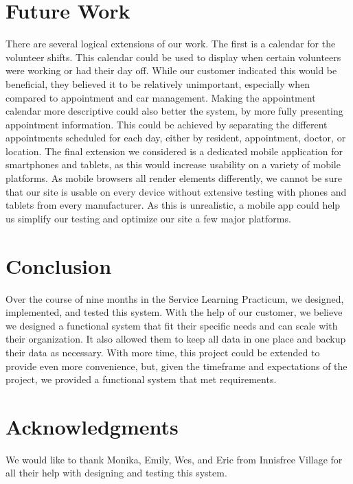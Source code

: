 \documentclass{sig-alternate}
\begin{document}
\section{Future Work}
There are several logical extensions of our work. The first is a calendar for the volunteer shifts. This calendar could be used to display when certain volunteers were working or had their day off. While our customer indicated this would be beneficial, they believed it to be relatively unimportant, especially when compared to appointment and car management. Making the appointment calendar more descriptive could also better the system, by more fully presenting appointment information. This could be achieved by separating the different appointments scheduled for each day, either by resident, appointment, doctor, or location. The final extension we considered is a dedicated mobile application for smartphones and tablets, as this would increase usability on a variety of mobile platforms. As mobile browsers all render elements differently, we cannot be sure that our site is usable on every device without extensive testing with phones and tablets from every manufacturer. As this is unrealistic, a mobile app could help us simplify our testing and optimize our site a few major platforms.

\section{Conclusion}
Over the course of nine months in the Service Learning Practicum, we designed, implemented, and tested this system.  With the help of our customer, we believe we designed a functional system that fit their specific needs and can scale with their organization.  It also allowed them to keep all data in one place and backup their data as necessary.  With more time, this project could be extended to provide even more convenience, but, given the timeframe and expectations of the project, we provided a functional system that met requirements.  

\section{Acknowledgments}
We would like to thank Monika, Emily, Wes, and Eric from Innisfree Village for all their help with designing and testing this system.
 

%

%
%
\end{document}
